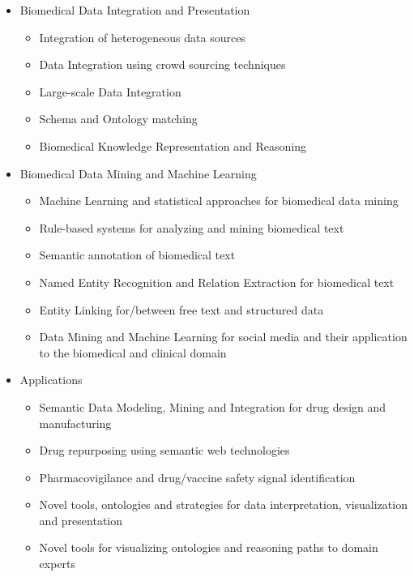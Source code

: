 \documentclass[runningheads,a4paper]{llncs}
\begin{document}
\begin{itemize}
\setlength{\itemsep}{3pt}

\item Biomedical Data Integration and Presentation
     \begin{itemize} 
     \setlength{\itemsep}{3pt}
        \item Integration of heterogeneous data sources
        \item Data Integration using crowd sourcing techniques
        \item Large-scale Data Integration
        \item Schema and Ontology matching
        \item Biomedical Knowledge Representation and Reasoning
     \end{itemize}

\item Biomedical Data Mining and Machine Learning
     \begin{itemize} 
     \setlength{\itemsep}{3pt}
        \item Machine Learning and statistical approaches for biomedical data mining
        \item Rule-based systems for analyzing and mining biomedical text
        \item Semantic annotation of biomedical text
        \item Named Entity Recognition and Relation Extraction for biomedical text
        \item Entity Linking for/between free text and structured data
        \item Data Mining and Machine Learning for social media and their application to the biomedical and clinical domain
     \end{itemize}

\item Applications
     \begin{itemize} 
     \setlength{\itemsep}{3pt}
        \item Semantic Data Modeling, Mining and Integration for drug design and manufacturing 
        \item Drug repurposing using semantic web technologies
        \item Pharmacovigilance and drug/vaccine safety signal identification
        \item Novel tools, ontologies and strategies for data interpretation, visualization and presentation
        \item Novel tools for visualizing ontologies and reasoning paths to domain experts
     \end{itemize}
\end{itemize}
\end{document}
